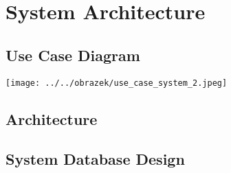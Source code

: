 \chapter*{System Architecture}

\section*{Use Case Diagram}
\texttt{[image: ../../obrazek/use\_case\_system\_2.jpeg]}
\section*{Architecture}
\section*{System Database Design}